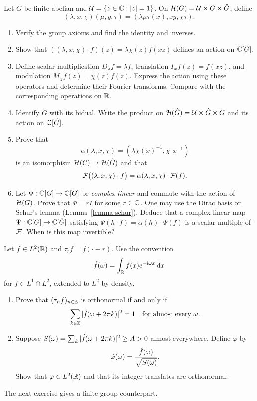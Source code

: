 \begin{exo}
\label{exo-groupe-heisenberg}
Let $G$ be finite abelian and $\mathcal{U}=\{z\in\mathbb{C}:|z|=1\}$. On
$\mathcal{H}(G)=\mathcal{U}\times G\times\hat{G}$, define
\[
 (\lambda,x,\chi)(\mu,y,\tau)
 =(\lambda\mu\tau(x),xy,\chi\tau).
\]
\begin{enumerate}
\item Verify the group axioms and find the identity and inverses.
\item Show that
$((\lambda,x,\chi)\cdot f)(z)=\lambda\chi(z)f(xz)$
defines an action on $\mathbb{C}[G]$.
\item Define scalar multiplication $D_\lambda f=\lambda f$, translation
$T_xf(z)=f(xz)$, and modulation $M_\chi f(z)=\chi(z)f(z)$.
Express the action using these operators and determine their Fourier
transforms. Compare with the corresponding operations on $\mathbb{R}$.
\item Identify $G$ with its bidual. Write the product on
$\mathcal{H}(\hat{G})=\mathcal{U}\times\hat{G}\times G$ and its action on $\mathbb{C}[\hat{G}]$.
\item Prove that
\[
 \alpha(\lambda,x,\chi)=(\lambda\chi(x)^{-1},\chi,x^{-1})
\]
is an isomorphism $\mathcal{H}(G)\to\mathcal{H}(\hat{G})$ and that
\[
 \mathcal{F}\big((\lambda,x,\chi)\cdot f\big)
 =\alpha(\lambda,x,\chi)\cdot\mathcal{F}(f).
\]
\item Let $\Phi:\mathbb{C}[G]\to\mathbb{C}[G]$ be \emph{complex-linear} and commute with
the action of $\mathcal{H}(G)$. Prove that $\Phi=rI$ for some $r\in\mathbb{C}$.
One may use the Dirac basis or Schur's lemma (Lemma~\ref{lemma-schur}).
Deduce that a complex-linear map $\Psi:\mathbb{C}[G]\to\mathbb{C}[\hat{G}]$ satisfying
$\Psi(h\cdot f)=\alpha(h)\cdot\Psi(f)$ is a scalar multiple of $\mathcal{F}$.
When is this map invertible?
\end{enumerate}
\end{exo}


\begin{exo}
\label{exo-series-fourier-orthogonalisation}
Let $f\in L^2(\mathbb{R})$ and $\tau_rf=f(\cdot-r)$. Use the convention
\[
 \hat{f}(\omega)=\int_{\mathbb{R}}f(x)e^{-\mathrm{i}\omega x}\,\mathrm{d} x
\]
for $f\in L^1\cap L^2$, extended to $L^2$ by density.
\begin{enumerate}
\item Prove that $(\tau_nf)_{n\in\mathbb{Z}}$ is orthonormal if and only if
\[
 \sum_{k\in\mathbb{Z}}|\hat{f}(\omega+2\pi k)|^2=1
 \quad\text{for almost every }\omega.
\]
\item\label{notation-24}
Suppose $S(\omega)=\sum_k|\hat{f}(\omega+2\pi k)|^2\geq A>0$ almost
 everywhere. Define $\varphi$ by
\[
 \hat{\varphi}(\omega)=\frac{\hat{f}(\omega)}{\sqrt{S(\omega)}}.
\]
Show that $\varphi\in L^2(\mathbb{R})$ and that its integer translates are orthonormal.
\end{enumerate}
The next exercise gives a finite-group counterpart.
\end{exo}

